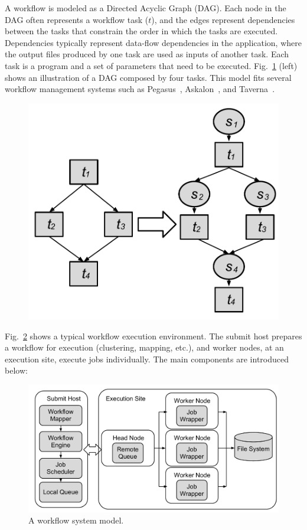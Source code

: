 \documentclass[final]{IEEEtran}
\begin{document}
A workflow is modeled as a Directed Acyclic Graph (DAG). Each node in the DAG often represents a workflow task ($t$), and the edges represent dependencies between the tasks that constrain the order in which the tasks are executed. Dependencies typically represent data-flow dependencies in the application, where the output files produced by one task are used as inputs of another task. Each task is a program and a set of parameters that need to be executed. Fig.~\ref{fig:odag} (left) shows an illustration of a DAG composed by four tasks. This model fits several workflow management systems such as Pegasus~\cite{Deelman:2005:PFM:1239649.1239653}, Askalon~\cite{Fahringer:2005:ATS:1064323.1064331}, and Taverna~\cite{Oinn:2006:TLC:1148437.1148448}.

\begin{figure}[htb]
	\centering
	\includegraphics[width=0.7\linewidth]{figure/odag.pdf}
	\label{fig:odag}
	\vspace{-10pt}
\end{figure}

Fig.~\ref{fig:system} shows a typical workflow execution environment. The submit host prepares a workflow for execution (clustering, mapping, etc.), and worker nodes, at an execution site, execute jobs individually. The main components are introduced below:

\begin{figure}[htb]
\centering
  \includegraphics[width=0.95\linewidth]{figure/execution_vertical.pdf}
  \caption{A workflow system model.}
  \label{fig:system}
  \vspace{-10pt}
\end{figure}
\end{document}
